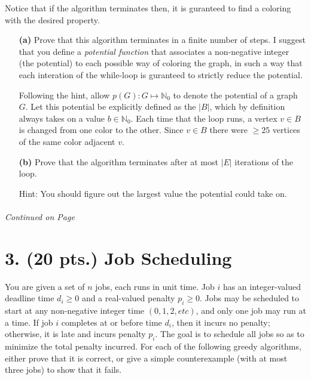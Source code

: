 \documentclass[11pt]{article}
\begin{document}
\begin{itemize}
Notice that if the algorithm terminates then, it is 
guranteed to find a coloring with the desired property.

\begin{itemize}
\item[{\bf (a)}] Prove that this algorithm terminates in a finite number of steps. 
I suggest that you define a \emph{potential function} that associates a non-negative
integer (the potential) to each possible way of coloring the graph, in such a way that
each interation of the while-loop is guranteed to strictly reduce the potential.

Following the hint, allow $p(G):G\mapsto\mathbb{N}_0$ to denote the potential of a graph $G$.
 Let this potential be explicitly defined as the $|B|$, which by definition always takes on a 
value $b\in \mathbb{N}_0$. Each time that the loop runs, a vertex $v\in B$ is changed from 
one color to the other. Since $v \in B$ there were $\geq 25$ vertices of the same color adjacent
$v$.  

\item[{\bf (b)}] Prove that the algorithm terminates after at most $|E|$ iterations
of the loop. 

Hint: You should figure out the largest value the potential could take on.
\end{itemize}


\label{pg:end-of-p2}
%
\paragraph{} \emph{Continued on Page \pageref{pg:p2-continuation}}

\newpage

\section*{3. (20 pts.) Job Scheduling}

You are given a set of $n$ jobs, each runs in unit time.
 Job $i$ has an integer-valued deadline time $d_i \geq  0$ and a real-valued penalty $p_i \geq 0$.
 Jobs may be scheduled to start at any non-negative integer time $(0, 1, 2, etc)$, and
 only one job may run at a time. If job $i$ completes at or before time $d_i$, then it 
incurs no penalty; otherwise, it is late and incurs penalty $p_i$. The goal is to 
schedule all jobs so as to minimize the total penalty incurred.
For each of the following greedy algorithms, either prove that it is correct, or give
 a simple counterexample (with at most three jobs) to show that it fails.


\end{itemize}
\end{document}
